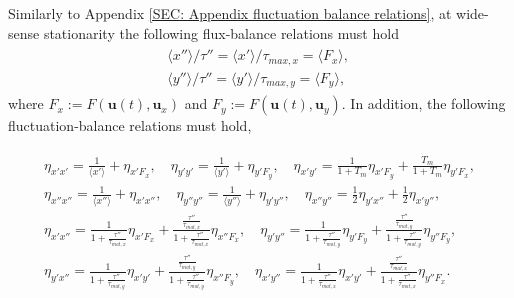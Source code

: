 \documentclass[%
 reprint,prx,
superscriptaddress,
%
%
%
%
%
%
%
%
%
 amsmath,amssymb,
 aps,
%
%
%
%
%
%
]{revtex4-2}
\begin{document}
Similarly to Appendix \ref{SEC: Appendix fluctuation balance relations}, at wide-sense stationarity the following flux-balance relations must hold~\cite{hilfinger2015a}
\begin{align}
\begin{split}
 &\langle x'' \rangle / \tau'' = \langle x' \rangle /\tau_{max,x} = \langle F_x \rangle, \quad \\ &\langle y'' \rangle / \tau'' = \langle y' \rangle /\tau_{max,y} = \langle F_y \rangle ,
\end{split}
\label{EQ: 3-step flux-balance}
\end{align}
where $F_{x} := F(\mathbf{u}(t), \mathbf{u}_x)$ and $F_{y} := F(\mathbf{u}(t), \mathbf{u}_y)$. In addition, the following fluctuation-balance relations must hold, 
\begin{widetext}

\begin{align}
\begin{split}
 \eta_{x'x'}   = \frac{1}{\langle x' \rangle} + \eta_{x'F_{x}} , \quad \eta_{y'y'} = \frac{1}{\langle y' \rangle} + \eta_{y'F_{y}} , \quad \eta_{x'y'} = \frac{1}{1 + T_{m}}\eta_{x'F_{y}} + \frac{T_{m}}{1 + T_{m}}\eta_{y'F_{x}} ,\\
 \eta_{x''x''} = \frac{1}{\langle x'' \rangle} + \eta_{x'x''} , \quad \eta_{y''y''} = \frac{1}{\langle y'' \rangle} + \eta_{y'y''} , \quad \eta_{x''y''} = \frac{1}{2}\eta_{y'x''} + \frac{1}{2}\eta_{x'y''} , \\
 \eta_{x'x''}  = \frac{1}{1 + \frac{\tau''}{\tau_{mat,x}}}\eta_{x'F_{x}} + \frac{\frac{\tau''}{\tau_{mat,x}}}{1 + \frac{\tau''}{\tau_{mat,x}}}\eta_{x''F_{x}} ,\quad \eta_{y'y''} = \frac{1}{1 + \frac{\tau''}{\tau_{mat,y}}}\eta_{y'F_{y}} + \frac{\frac{\tau''}{\tau_{mat,y}}}{1 + \frac{\tau''}{\tau_{mat,y}}}\eta_{y''F_{y}} , \\
 \eta_{y'x''}  = \frac{1}{1 + \frac{\tau''}{\tau_{mat,y}}}\eta_{x'y'} + \frac{\frac{\tau''}{\tau_{mat,y}}}{1 + \frac{\tau''}{\tau_{mat,y}}}\eta_{x''F_{y}}  ,\quad \eta_{x'y''} =  \frac{1}{1 + \frac{\tau''}{\tau_{mat,x}}}\eta_{x'y'} + \frac{\frac{\tau''}{\tau_{mat,x}}}{1 + \frac{\tau''}{\tau_{mat,x}}}\eta_{y''F_{x}}  . 
\end{split}
 \label{EQ: 3-step fluctuation-balance}
\end{align}
\end{widetext}
\end{document}
